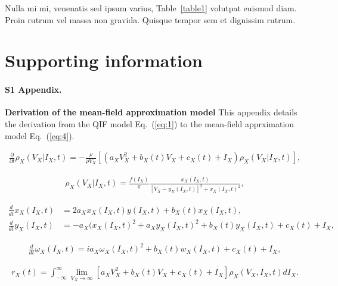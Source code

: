 \documentclass[10pt,letterpaper]{article}
\begin{document}
Nulla mi mi, venenatis sed ipsum varius, Table~\ref{table1} volutpat euismod diam. Proin rutrum vel massa non gravida. Quisque tempor sem et dignissim rutrum. 

\section*{Supporting information}


\paragraph*{S1 Appendix.}
\label{S1_Appendix}
{\bf Derivation of the mean-field approximation model} This appendix details the derivation from the QIF model Eq.~(\ref{eq:1}) to the mean-field apprximation model Eq.~(\ref{eq:4}).

\begin{eqnarray}
\label{eq:7}
    \frac{\partial}{\partial t}\rho_{X}(V_{X}|I_{X},t)=-\frac{\rho}{\rho V_{X}}\left[ \left( a_{X}V_{X}^{2} + b_{X}(t)V_{X} + c_{X}(t) + I_{X}\right) \rho_{X}(V_{X}|I_{X},t) \right],
\end{eqnarray}

\begin{eqnarray}
\label{eq:8}
    \rho_{X}(V_{X}|I_{X},t) = \frac{f(I_{X})}{\pi}\frac{x_{X}(I_{X},t)}{\left[ V_{X}-y_{X}(I_{X},t)\right]^{2} + x_{X}(I_{X},t)^{2}},
\end{eqnarray}

\begin{subequations}
\label{eq:9}
\begin{align}
    \frac{d}{dt}x_{X}(I_{X},t) &= 2a_{X}x_{X}(I_{X},t)y(I_{X},t) + b_{X}(t)x_{X}(I_{X},t), \label{eq:9a} \\
    \frac{d}{dt}y_{X}(I_{X},t) &= -a_{X}(x_{X}(I_{X},t)^{2} + a_{X}y_{X}(I_{X},t)^{2} + b_{X}(t)y_{X}(I_{X},t) + c_{X}(t) + I_{X}, \label{eq:9b}
\end{align}
\end{subequations}

\begin{eqnarray}
\label{eq:10}
    \frac{d}{dt}\omega_{X}(I_{X},t) = ia_{X}\omega_{X}(I_{X},t)^{2} + b_{X}(t)w_{X}(I_{X},t) + c_{X}(t) + I_{X},
\end{eqnarray}

\begin{eqnarray}
\label{eq:11}
    r_{X}(t)= \int_{-\infty}^{\infty} \lim_{V_{X}\to\infty} \left[ a_{X}V_{X}^{2}+b_{X}(t)V_{X}+c_{X}(t)+I_{X}\right]\rho_{X}(V_{X},I_{X},t)dI_{X}.
\end{eqnarray}
\end{document}
